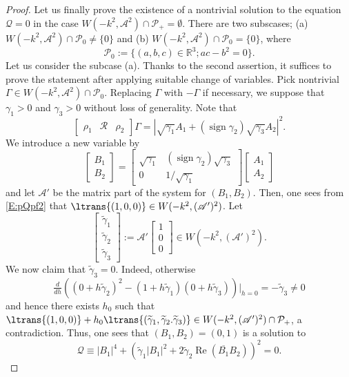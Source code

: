 \documentclass[11pt,a4paper,oneside]{amsart}
\theoremstyle{plain}
\theoremstyle{remark}
\numberwithin{equation}{section}
\newcommand{\R}{\mathbb{R}}
\renewcommand{\Re}{\operatorname{Re}}
\DeclareMathOperator{\sign}{sign}
\theoremstyle{definition}
\begin{document}
\begin{proof}
Let us finally prove the existence of a nontrivial solution to the equation $\mathcal{Q}=0$ in the case $W(-k^2,\mathscr{A}^2) \cap \mathcal{P}_+= \emptyset$.
There are
two subscases; (a) $W(-k^2,\mathscr{A}^2) \cap \mathcal{P}_0\neq \{0\}$ and (b) $W(-k^2,\mathscr{A}^2) \cap \mathcal{P}_0= \{0\}$, where
\[
\mathcal{P}_0:=\{(a,b,c) \in \R^3 ; ac-b^2=0\}.
\]
Let us consider the subcase (a). 
Thanks to the second assertion, it suffices to prove the statement after applying suitable change of variables.
Pick nontrivial $\Gamma \in W(-k^2,\mathscr{A}^2)\cap \mathcal{P}_0$. 
Replacing $\Gamma$ with $-\Gamma$ if necessary, we suppose that $\gamma_1>0$ and $\gamma_3>0$ without loss of generality.
%
Note that
\[
	\begin{bmatrix}
	\rho_1 & \mathcal{R} & \rho_2
	\end{bmatrix}\Gamma
	= |\sqrt{\gamma_1 }A_1 + (\sign \gamma_2)\sqrt{\gamma_3}A_2|^2.
\]
We introduce a new variable by
\[
	\begin{bmatrix} B_1 \\ B_2 \end{bmatrix} = \begin{bmatrix} \sqrt{\gamma_1} & (\sign \gamma_2)\sqrt{\gamma_3} \\
0& 1/\sqrt{\gamma_1} \end{bmatrix}
\begin{bmatrix}
	A_1 \\ A_2
\end{bmatrix}
\]
and let $\mathscr{A}'$ be the matrix part of the system for $(B_1,B_2)$.
Then, one sees from \eqref{E:pQpf2} that
$\ltrans{(1,0,0)}\in W(-k^2,(\mathscr{A}')^2)$.
%
Let 
\[
	 \begin{bmatrix} \widetilde{\gamma}_1 \\ \widetilde{\gamma}_2 \\ \widetilde{\gamma}_3 \end{bmatrix}:=\mathscr{A}'\begin{bmatrix} 1 \\0\\0 \end{bmatrix} \in W(-k^2,(\mathscr{A}')^2)
	.
\]
We now claim that $\widetilde{\gamma}_3=0$. 
Indeed, otherwise
\[
	\tfrac{d}{dh}((0+h\widetilde{\gamma}_2)^2-(1+h\widetilde{\gamma}_1)(0+h\widetilde{\gamma}_3))|_{h=0} =- \widetilde{\gamma}_3 \neq0
\]
and
hence there exists $h_0$ such that
$\ltrans{(1,0,0)}+h_0\ltrans{(\widetilde{\gamma}_1,\widetilde{\gamma}_2.\widetilde{\gamma}_3)} \in W(-k^2,(\mathscr{A}')^2) \cap \mathcal{P}_+$, a contradiction.
Thus, one sees that $(B_1,B_2)=(0,1)$ is a solution to 
\[
	\mathcal{Q} \equiv |B_1|^4 + (\widetilde{\gamma}_1 |B_1|^2 +2\widetilde{\gamma}_2\Re (\overline{B_1} B_2) )^2
=0.
\]


\end{proof}
\end{document}
